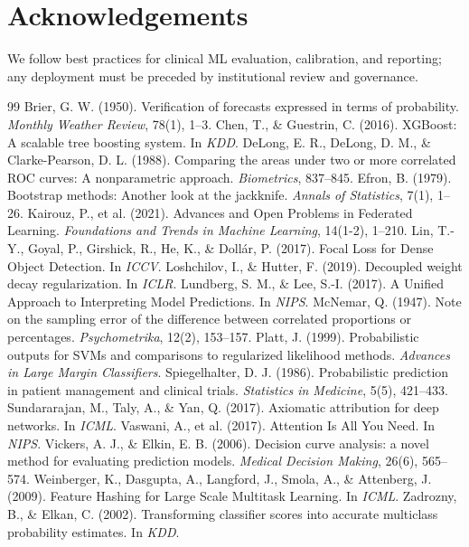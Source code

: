 \documentclass[11pt]{article}
\begin{document}
\section*{Acknowledgements}
We follow best practices for clinical ML evaluation, calibration, and reporting; any deployment must be preceded by institutional review and governance.

\begin{thebibliography}{99}
 Brier, G. W. (1950). Verification of forecasts expressed in terms of probability. \emph{Monthly Weather Review}, 78(1), 1--3.
 Chen, T., \& Guestrin, C. (2016). XGBoost: A scalable tree boosting system. In \emph{KDD}.
 DeLong, E. R., DeLong, D. M., \& Clarke-Pearson, D. L. (1988). Comparing the areas under two or more correlated ROC curves: A nonparametric approach. \emph{Biometrics}, 837--845.
 Efron, B. (1979). Bootstrap methods: Another look at the jackknife. \emph{Annals of Statistics}, 7(1), 1--26.
 Kairouz, P., et al. (2021). Advances and Open Problems in Federated Learning. \emph{Foundations and Trends in Machine Learning}, 14(1-2), 1--210.
 Lin, T.-Y., Goyal, P., Girshick, R., He, K., \& Doll\'ar, P. (2017). Focal Loss for Dense Object Detection. In \emph{ICCV}.
 Loshchilov, I., \& Hutter, F. (2019). Decoupled weight decay regularization. In \emph{ICLR}.
 Lundberg, S. M., \& Lee, S.-I. (2017). A Unified Approach to Interpreting Model Predictions. In \emph{NIPS}.
 McNemar, Q. (1947). Note on the sampling error of the difference between correlated proportions or percentages. \emph{Psychometrika}, 12(2), 153--157.
 Platt, J. (1999). Probabilistic outputs for SVMs and comparisons to regularized likelihood methods. \emph{Advances in Large Margin Classifiers}.
 Spiegelhalter, D. J. (1986). Probabilistic prediction in patient management and clinical trials. \emph{Statistics in Medicine}, 5(5), 421--433.
 Sundararajan, M., Taly, A., \& Yan, Q. (2017). Axiomatic attribution for deep networks. In \emph{ICML}.
 Vaswani, A., et al. (2017). Attention Is All You Need. In \emph{NIPS}.
 Vickers, A. J., \& Elkin, E. B. (2006). Decision curve analysis: a novel method for evaluating prediction models. \emph{Medical Decision Making}, 26(6), 565--574.
 Weinberger, K., Dasgupta, A., Langford, J., Smola, A., \& Attenberg, J. (2009). Feature Hashing for Large Scale Multitask Learning. In \emph{ICML}.
 Zadrozny, B., \& Elkan, C. (2002). Transforming classifier scores into accurate multiclass probability estimates. In \emph{KDD}.
\end{thebibliography}
\end{document}
